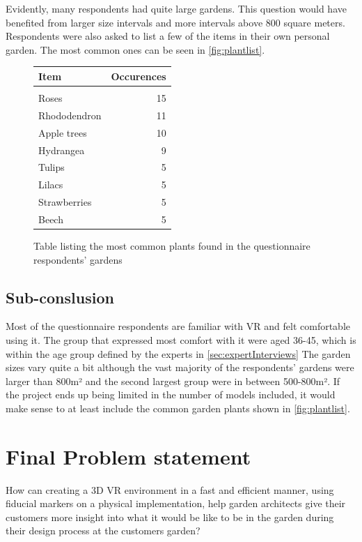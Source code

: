 			Evidently, many respondents had quite large gardens. This question would have benefited from larger size intervals and more intervals above 800 square meters.\\
			
			Respondents were also asked to list a few of the items in their own personal garden. The most common ones can be seen in  \autoref{fig:plantlist}.
			\begin{figure}[H]
				\begin{center}
					\begin{tabular}{  l  r }
						Item & Occurences  \\ \hline
						& \\
						Roses & 15 \\ 
						Rhododendron & 11  \\ 
						Apple trees & 10  \\ 
						Hydrangea & 9  \\ 
						Tulips & 5  \\ 
						Lilacs & 5  \\ 
						Strawberries & 5  \\ 
						Beech & 5  \\
					\end{tabular}
				\end{center}
				\caption{Table listing the most common plants found in the questionnaire respondents' gardens}
				\label{fig:plantlist}
			\end{figure}
			
			\subsection{Sub-conslusion}
			Most of the questionnaire respondents are familiar with VR and felt comfortable using it. The group that expressed most comfort with it were aged 36-45, which is within the age group defined by the experts in \autoref{sec:expertInterviews}
			The garden sizes vary quite a bit although the vast majority of the respondents' gardens were larger than 800m² and the second largest group were in between 500-800m².
			If the project ends up being limited in the number of models included, it would make sense to at least include the common garden plants shown in \autoref{fig:plantlist}.
			
			\section{Final Problem statement}\label{sec:FPS}
			How can creating a 3D VR environment in a fast and efficient manner, using fiducial markers on a physical implementation, help garden architects give their customers more insight into what it would be like to be in the garden during their design process at the customers garden?
			
